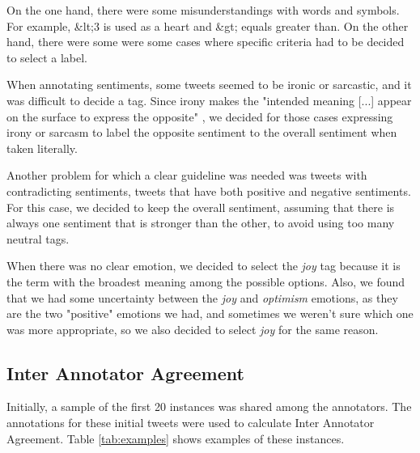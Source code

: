 \documentclass[11pt,a4paper]{article}
\begin{document}
On the one hand, there were some misunderstandings with words and symbols. For example, \&lt;3 is used as a heart and \&gt; equals greater than. On the other hand, there were some were some cases where specific criteria had to be decided to select a label.

When annotating sentiments, some tweets seemed to be ironic or sarcastic, and it was difficult to decide a tag. Since irony makes the "intended meaning [...] appear on the surface to express the opposite" \cite{OUP2022}, we decided for those cases expressing irony or sarcasm to label the opposite sentiment to the overall sentiment when taken literally. 

Another problem for which a clear guideline was needed was tweets with contradicting sentiments, tweets that have both positive and negative sentiments. For this case, we decided to keep the overall sentiment, assuming that there is always one sentiment that is stronger than the other, to avoid using too many neutral tags.

When there was no clear emotion, we decided to select the \textit{joy} tag because it is the term with the broadest meaning among the possible options. Also, we found that we had some uncertainty between the \textit{joy} and \textit{optimism} emotions, as they are the two "positive" emotions we had, and sometimes we weren't sure which one was more appropriate, so we also decided to select \textit{joy} for the same reason.

\subsection{Inter Annotator Agreement}

Initially, a sample of the first 20 instances was shared among the annotators. The annotations for these initial tweets were used to calculate Inter Annotator Agreement. Table \ref{tab:examples} shows examples of these instances.
\end{document}
